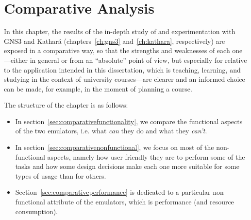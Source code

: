 
\chapter{Comparative Analysis}
\label{ch:comparative}

In this chapter, the results of the in-depth study of and experimentation with GNS3 and Kathará (chapters~\ref{ch:gns3} and~\ref{ch:kathara}, respectively) are exposed in a comparative way, so that the strengths and weaknesses of each one---either in general or from an ``absolute'' point of view, but especially for relative to the application intended in this dissertation, which is teaching, learning, and studying in the context of university courses---are clearer and an informed choice can be made, for example, in the moment of planning a course.

The structure of the chapter is as follows:
\begin{itemize}
  \item In section~\ref{sec:comparativefunctionality}, we compare the functional aspects of the two emulators, i.e. what \emph{can} they do and what they \emph{can't}.
  \item In section~\ref{sec:comparativenonfunctional}, we focus on most of the non-functional aspects, namely how user friendly they are to perform some of the tasks and how some design decisions make each one more suitable for some types of usage than for others.
  \item Section~\ref{sec:comparativeperformance} is dedicated to a particular non-functional attribute of the emulators, which is performance (and resource consumption).
\end{itemize}







